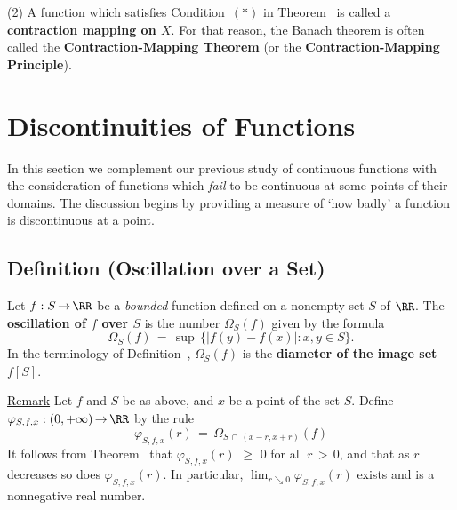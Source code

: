 \V

        (2) A function which satisfies Condition~$({\ast})$ in Theorem~ is called a {\bf contraction mapping on $X$}.
    For that reason, the Banach theorem is often called the {\bf Contraction-Mapping Theorem} (or the {\bf Contraction-Mapping Principle}).
    

                \section{{\bf Discontinuities of Functions}}
                \label{SectF40}

\V
\V

        In this section we complement our previous study of continuous functions with the consideration of functions which {\em fail} to be continuous at some points of their domains.
    The discussion begins by providing a measure of `how badly' a function is discontinuous at a point.


\V


             \subsection{\small{\bf Definition} (Oscillation over a Set)}
            \label{DefF40.20}

\V

        Let $f:S \,{\rightarrow}\, {\RR}$ be a {\em bounded} function defined on a nonempty set $S$ of ${\RR}$.
    The {\bf oscillation of $f$ over $S$} is the number ${\Omega}_{S}(f)$ given by the formula
        \begin{equation}
        \label{EqnF.60}
        {\Omega}_{S}(f) \,=\, {\sup}\,\{|f(y)-f(x)|: x,y{\in}S\}.
        \end{equation}
    In the terminology of Definition~, ${\Omega}_{S}(f)$ is the {\bf diameter of the image set $f[S]$}.

\V

        \underline{Remark} Let $f$ and $S$ be as above, and $x$ be a point of the set $S$.
    Define ${\varphi}_{S,f,x}:(0,+{\infty}) \,{\rightarrow}\, {\RR}$ by the rule
        \begin{displaymath}
        {\varphi}_{S,f,x}(r) \,=\, {\Omega}_{S\,{\cap}\,(x-r,x+r)} (f)
        \end{displaymath}
    It follows from Theorem~ that ${\varphi}_{S,f,x}(r)\,\,{\geq}\,\,0$ for all $r\,>\,0$, and that as $r$ decreases so does ${\varphi}_{S,f,x}(r)$.
    In particular, $\lim_{r{\searrow}0} {\varphi}_{S,f,x}(r)$ exists and is a nonnegative real number.

